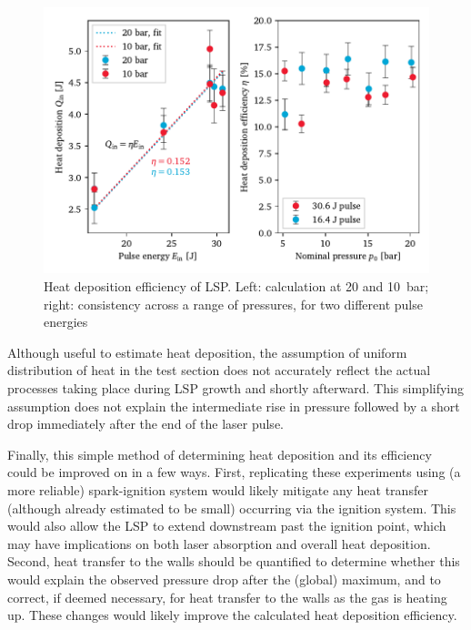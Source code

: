             \begin{figure}[h]
                \centering
                \includegraphics[]{assets/5 results/heatEfficiency}
                \caption[Heat deposition efficiency of LSP]{Heat deposition efficiency of LSP. Left: calculation at 20 and 10~bar; right: consistency across a range of pressures, for two different pulse energies}
                \label{fig:heatEfficiency}
            \end{figure}

            Although useful to estimate heat deposition, the assumption of uniform distribution of heat in the test section does not accurately reflect the actual processes taking place during LSP growth and shortly afterward. This simplifying assumption does not explain the intermediate rise in pressure followed by a short drop immediately after the end of the laser pulse.

            Finally, this simple method of determining heat deposition and its efficiency could be improved on in a few ways. First, replicating these experiments using (a more reliable) spark-ignition system would likely mitigate any heat transfer (although already estimated to be small) occurring via the ignition system. This would also allow the LSP to extend downstream past the ignition point, which may have implications on both laser absorption and overall heat deposition. Second, heat transfer to the walls should be quantified to determine whether this would explain the observed pressure drop after the (global) maximum, and to correct, if deemed necessary, for heat transfer to the walls as the gas is heating up. These changes would likely improve the calculated heat deposition efficiency.
    
